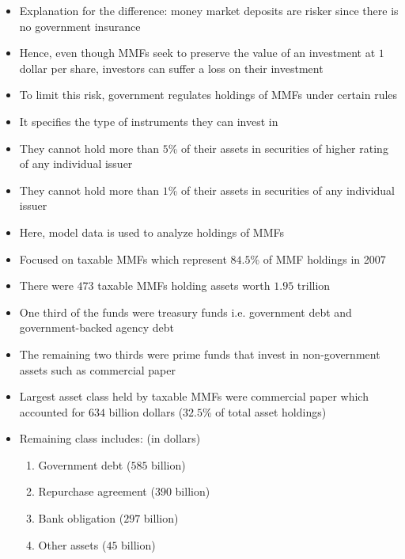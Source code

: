 \documentclass[11pt]{beamer}
\begin{document}
\begin{frame}
\begin{itemize}
\item Explanation for the difference: money market deposits are risker since there is no government insurance
\item Hence, even though MMFs seek to preserve the value of an investment at $1$ dollar per share, investors can suffer a loss on their investment
\item To limit this risk, government regulates holdings of MMFs under certain rules
\item It specifies the type of instruments they can invest in
\item They cannot hold more than $5$\% of their assets in securities of higher rating of any individual issuer
\item They cannot hold more than $1$\% of their assets in securities of any individual issuer
\item Here, model data is used to analyze holdings of MMFs
\item Focused on taxable MMFs which represent $84.5$\% of MMF holdings in 2007
\item There were $473$ taxable MMFs holding assets worth $1.95$ trillion
\end{itemize}
\end{frame}

\begin{frame}
\begin{itemize}
\item One third of the funds were treasury funds i.e. government debt and government-backed agency debt
\item The remaining two thirds were prime funds that invest in non-government assets such as commercial paper
\item Largest asset class held by taxable MMFs were commercial paper which accounted for $634$ billion dollars ($32.5$\% of total asset holdings)
\item Remaining class includes: (in dollars)
\begin{enumerate}
\item Government debt ($585$ billion)
\item Repurchase agreement ($390$ billion)
\item Bank obligation ($297$ billion)
\item Other assets ($45$ billion)
\end{enumerate}
\end{itemize}
\end{frame}
\end{document}
